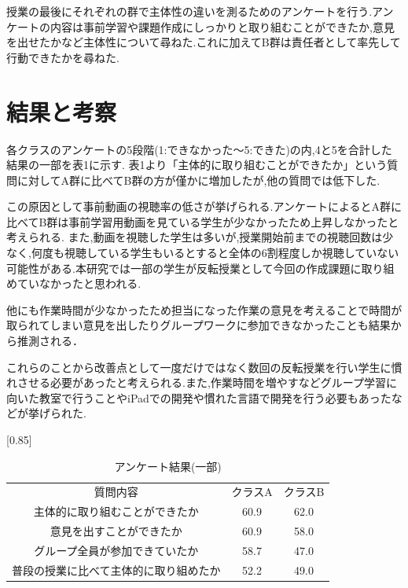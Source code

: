 \documentclass[twocolumn,10pt,a4j]{jsarticle}
\begin{document}
授業の最後にそれぞれの群で主体性の違いを測るためのアンケートを行う.アンケートの内容は事前学習や課題作成にしっかりと取り組むことができたか,意見を出せたかなど主体性について尋ねた.これに加えてB群は責任者として率先して行動できたかを尋ねた.


\section{結果と考察}
各クラスのアンケートの5段階(1:できなかった〜5:できた)の内,4と5を合計した結果の一部を表1に示す.
表1より「主体的に取り組むことができたか」という質問に対してA群に比べてB群の方が僅かに増加したが,他の質問では低下した.

この原因として事前動画の視聴率の低さが挙げられる.アンケートによるとA群に比べてB群は事前学習用動画を見ている学生が少なかったため上昇しなかったと考えられる.
また,動画を視聴した学生は多いが,授業開始前までの視聴回数は少なく,何度も視聴している学生もいるとすると全体の6割程度しか視聴していない可能性がある.本研究では一部の学生が反転授業として今回の作成課題に取り組めていなかったと思われる.

他にも作業時間が少なかったため担当になった作業の意見を考えることで時間が取られてしまい意見を出したりグループワークに参加できなかったことも結果から推測される．

これらのことから改善点として一度だけではなく数回の反転授業を行い学生に慣れさせる必要があったと考えられる.また,作業時間を増やすなどグループ学習に向いた教室で行うことやiPadでの開発や慣れた言語で開発を行う必要もあったなどが挙げられた.\newline

\begin{table}[!hbt]
\begin{center}
\caption{アンケート結果(一部)}
\label{my-label}
\scalebox{0.85}[0.85]{
\begin{tabular}{|c|c|c|}
\cline{1-3}
 質問内容 & クラスA & クラスB \\ \cline{1-3}  
主体的に取り組むことができたか & 60.9 & 62.0 \\ \cline{1-3}  
 意見を出すことができたか & 60.9 & 58.0 \\ \cline{1-3}  
グループ全員が参加できていたか & 58.7 & 47.0 \\ \cline{1-3}  
普段の授業に比べて主体的に取り組めたか & 52.2 & 49.0 \\ \cline{1-3}  

\end{tabular}
}
\end{center}
\end{table}
\end{document}
